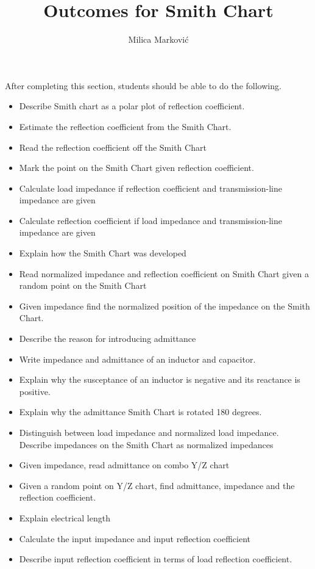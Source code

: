 \documentclass{ximera}
\title{Outcomes for Smith Chart}
\author{Milica Markovi{\'c}}
\begin{document}
\begin{abstract}
\end{abstract}

\maketitle

\begin{sectionOutcomes}

After completing this section, students should be able to do the following.

\begin{itemize}
\item Describe Smith chart as a polar plot of reflection coefficient.
\item Estimate the reflection coefficient from the Smith Chart.
\item Read the reflection coefficient off the Smith Chart
\item Mark the point on the Smith Chart given reflection coefficient.
\item Calculate load impedance if reflection coefficient and transmission-line impedance are given
\item Calculate reflection coefficient if load impedance and transmission-line impedance are given
\item Explain how the Smith Chart was developed
\item Read normalized impedance and reflection coefficient on Smith Chart  given a random point on the Smith Chart
\item Given impedance find the normalized position of the impedance on the Smith Chart.
\item Describe the reason for introducing admittance
\item Write impedance and admittance of an inductor and capacitor. 
\item Explain why the susceptance of an inductor is negative and its reactance is positive.
\item Explain why the admittance Smith Chart is rotated 180 degrees.
\item Distinguish between load impedance and normalized load impedance. Describe impedances on the Smith Chart as normalized impedances
\item Given impedance, read admittance on combo Y/Z chart
\item Given a random point on Y/Z chart, find admittance, impedance and the reflection coefficient.
\item Explain electrical length
\item Calculate the input impedance and input reflection coefficient
\item Describe input reflection coefficient in terms of load reflection coefficient.
\end{itemize}

\end{sectionOutcomes}
\end{document}
